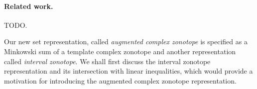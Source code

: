 \paragraph{Related work.} {\color{red} TODO.}



Our new set representation, called {\it augmented complex zonotope} is
specified as a Minkowski sum of a template complex zonotope and
another representation called {\it interval zonotope}.  We shall first
discuss the interval zonotope representation and its intersection with
linear inequalities, which would provide a motivation for introducing the
augmented complex zonotope representation.
